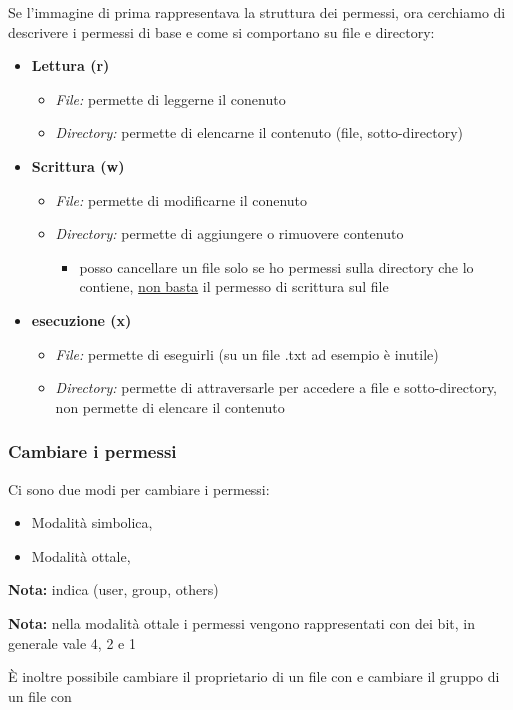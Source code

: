 \documentclass[../main.tex]{subfiles}
\begin{document}
\vspace{0.5cm}
Se l'immagine di prima rappresentava la struttura dei permessi, ora cerchiamo di descrivere i permessi di base e come si comportano
su file e directory:
\begin{itemize}
    \item \textbf{Lettura (r)}
    \begin{itemize}
        \item \textit{File: } permette di leggerne il conenuto
        \item \textit{Directory: } permette di elencarne il contenuto (file, sotto-directory)
    \end{itemize}
    \item \textbf{Scrittura (w)}
    \begin{itemize}
        \item \textit{File: } permette di modificarne il conenuto
        \item \textit{Directory: } permette di aggiungere o rimuovere contenuto
        \begin{itemize}
            \item posso cancellare un file solo se ho permessi sulla directory che lo contiene, \underline{non basta} il permesso di scrittura sul file
        \end{itemize}
    \end{itemize}
    \item \textbf{esecuzione (x)}
    \begin{itemize}
        \item \textit{File: } permette di eseguirli (su un file .txt ad esempio è inutile)
        \item \textit{Directory: } permette di attraversarle per accedere a file e sotto-directory, non permette di elencare il contenuto
    \end{itemize}
\end{itemize}

\subsubsection{Cambiare i permessi}
Ci sono due modi per cambiare i permessi:
\begin{itemize}
    \item Modalità simbolica, 
    \item Modalità ottale, 
\end{itemize}
\textbf{Nota:}  indica (user, group, others)

\textbf{Nota:} nella modalità ottale i permessi vengono rappresentati con dei bit, in generale  vale 4,  2 e  1

È inoltre possibile cambiare il proprietario di un file con  e cambiare il gruppo di un file con 
\end{document}

